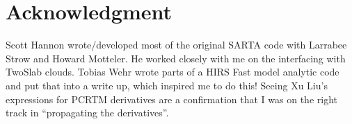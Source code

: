 \documentclass[11pt]{article}
\newcommand{\sa}{\textsf{SARTA}\xspace}
\begin{document}
\section{Acknowledgment}
Scott Hannon wrote/developed most of the original \sa code with
Larrabee Strow and Howard Motteler. He worked closely with me on the
interfacing with TwoSlab clouds. Tobias Wehr wrote parts of a HIRS
Fast model analytic code and put that into a write up, which inspired
me to do this! Seeing Xu Liu's expressions for PCRTM derivatives are a
confirmation that I was on the right track in ``propagating the
derivatives''.



\end{document}
